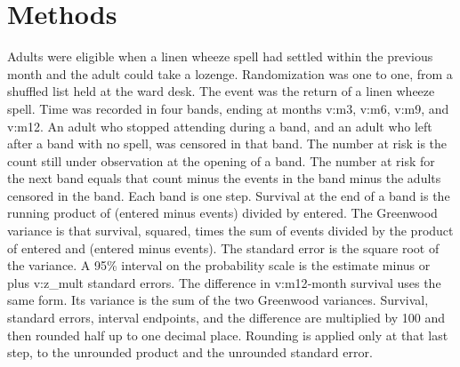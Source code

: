 \documentclass[11pt]{article}
\begin{document}
\section{Methods}
Adults were eligible when a linen wheeze spell had settled within the previous month and the adult could take a lozenge.
Randomization was one to one, from a shuffled list held at the ward desk.
The event was the return of a linen wheeze spell. Time was recorded in four bands, ending at months {{v:m3}}, {{v:m6}}, {{v:m9}}, and {{v:m12}}.
An adult who stopped attending during a band, and an adult who left after a band with no spell, was censored in that band.
The number at risk is the count still under observation at the opening of a band.
The number at risk for the next band equals that count minus the events in the band minus the adults censored in the band.
Each band is one step. Survival at the end of a band is the running product of (entered minus events) divided by entered.
The Greenwood variance is that survival, squared, times the sum of events divided by the product of entered and (entered minus events).
The standard error is the square root of the variance.
A 95\% interval on the probability scale is the estimate minus or plus {{v:z_mult}} standard errors.
The difference in {{v:m12}}-month survival uses the same form. Its variance is the sum of the two Greenwood variances.
Survival, standard errors, interval endpoints, and the difference are multiplied by 100 and then rounded half up to one decimal place.
Rounding is applied only at that last step, to the unrounded product and the unrounded standard error.
\end{document}
